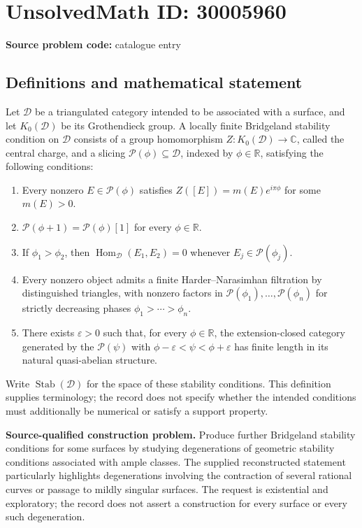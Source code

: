 \documentclass[11pt]{article}
\newcommand{\R}{\mathbb{R}}
\newcommand{\C}{\mathbb{C}}
\begin{document}
\section*{UnsolvedMath ID: 30005960}
\textbf{Source problem code:} catalogue entry
\subsection{Definitions and mathematical statement}
Let \(\mathcal D\) be a triangulated category intended to be associated with a surface, and let \(K_0(\mathcal D)\) be its Grothendieck group. A locally finite Bridgeland stability condition on \(\mathcal D\) consists of a group homomorphism \(Z:K_0(\mathcal D)\to\C\), called the central charge, and a slicing \(\mathcal P(\phi)\subseteq\mathcal D\), indexed by \(\phi\in\R\), satisfying the following conditions:
\begin{enumerate}
\item Every nonzero \(E\in\mathcal P(\phi)\) satisfies \(Z([E])=m(E)e^{i\pi\phi}\) for some \(m(E)>0\).
\item \(\mathcal P(\phi+1)=\mathcal P(\phi)[1]\) for every \(\phi\in\R\).
\item If \(\phi_1>\phi_2\), then \(\operatorname{Hom}_{\mathcal D}(E_1,E_2)=0\) whenever \(E_j\in\mathcal P(\phi_j)\).
\item Every nonzero object admits a finite Harder--Narasimhan filtration by distinguished triangles, with nonzero factors in \(\mathcal P(\phi_1),\ldots,\mathcal P(\phi_n)\) for strictly decreasing phases \(\phi_1>\cdots>\phi_n\).
\item There exists \(\varepsilon>0\) such that, for every \(\phi\in\R\), the extension-closed category generated by the \(\mathcal P(\psi)\) with \(\phi-\varepsilon<\psi<\phi+\varepsilon\) has finite length in its natural quasi-abelian structure.
\end{enumerate}
Write \(\operatorname{Stab}(\mathcal D)\) for the space of these stability conditions. This definition supplies terminology; the record does not specify whether the intended conditions must additionally be numerical or satisfy a support property.

\textbf{Source-qualified construction problem.} Produce further Bridgeland stability conditions for some surfaces by studying degenerations of geometric stability conditions associated with ample classes. The supplied reconstructed statement particularly highlights degenerations involving the contraction of several rational curves or passage to mildly singular surfaces. The request is existential and exploratory; the record does not assert a construction for every surface or every such degeneration.
\end{document}
